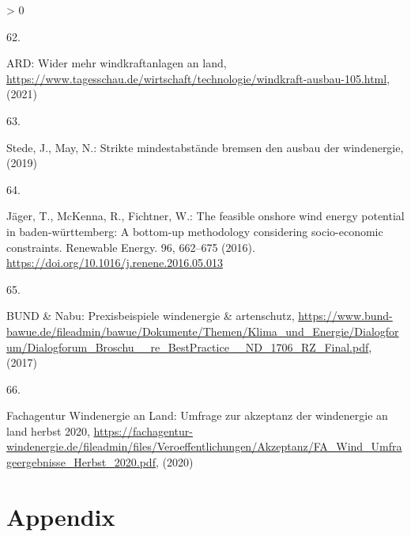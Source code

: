 \documentclass[a4paper,11pt]{article}
\newlength{\cslhangindent}
\newlength{\csllabelwidth}
\newenvironment{CSLReferences}[3] %
 {%
  \setlength{\parindent}{0pt}
  \ifodd #1 \everypar{\setlength{\hangindent}{\cslhangindent}}\ignorespaces\fi
  \ifnum #2 > 0
  \setlength{\parskip}{#2\baselineskip}
  \fi
 }%
 {}
\newcommand{\CSLLeftMargin}[1]{\parbox[t]{\maxof{\widthof{#1}}{\csllabelwidth}}{#1}}
\newcommand{\CSLRightInline}[1]{\parbox[t]{\linewidth}{#1}}
\begin{document}
\begin{CSLReferences}{0}{0}
\leavevmode\hypertarget{ref-ARD.2021}{}%
\CSLLeftMargin{62. }
\CSLRightInline{ARD: Wider mehr windkraftanlagen an land, \url{https://www.tagesschau.de/wirtschaft/technologie/windkraft-ausbau-105.html}, (2021)}

\leavevmode\hypertarget{ref-Stede.2019}{}%
\CSLLeftMargin{63. }
\CSLRightInline{Stede, J., May, N.: Strikte mindestabst{ä}nde bremsen den ausbau der windenergie, (2019)}

\leavevmode\hypertarget{ref-Jager.2016}{}%
\CSLLeftMargin{64. }
\CSLRightInline{Jäger, T., McKenna, R., Fichtner, W.: The feasible onshore wind energy potential in baden-w{ü}rttemberg: A bottom-up methodology considering socio-economic constraints. Renewable Energy. 96, 662--675 (2016). \url{https://doi.org/10.1016/j.renene.2016.05.013}}

\leavevmode\hypertarget{ref-BUNDux5cux26Nabu.2017}{}%
\CSLLeftMargin{65. }
\CSLRightInline{BUND \& Nabu: Prexisbeispiele windenergie {\&} artenschutz, \url{https://www.bund-bawue.de/fileadmin/bawue/Dokumente/Themen/Klima_und_Energie/Dialogforum/Dialogforum_Broschu__re_BestPractice__ND_1706_RZ_Final.pdf}, (2017)}

\leavevmode\hypertarget{ref-FachagenturWindenergieanLand.2020}{}%
\CSLLeftMargin{66. }
\CSLRightInline{Fachagentur Windenergie an Land: Umfrage zur akzeptanz der windenergie an land herbst 2020, \url{https://fachagentur-windenergie.de/fileadmin/files/Veroeffentlichungen/Akzeptanz/FA_Wind_Umfrageergebnisse_Herbst_2020.pdf}, (2020)}

\end{CSLReferences}
\indent
\setlength{\parindent}{17pt}
\setlength{\leftskip}{0pt}
\setlength{\parskip}{0pt}

\newpage

\appendix

\hypertarget{appendix}{%
\section{Appendix}\label{appendix}}
\end{document}
